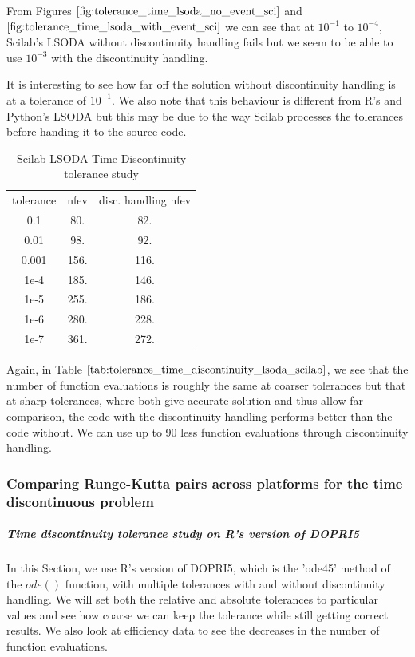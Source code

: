 From Figures $\ref{fig:tolerance_time_lsoda_no_event_sci}$ and $\ref{fig:tolerance_time_lsoda_with_event_sci}$ we can see that at $10^{-1}$ to $10^{-4}$, Scilab's LSODA without discontinuity handling fails but we seem to be able to use $10^{-3}$ with the discontinuity handling. 

It is interesting to see how far off the solution without discontinuity handling is at a tolerance of $10^{-1}$. We also note that this behaviour is different from R's and Python's LSODA but this may be due to the way Scilab processes the tolerances before handing it to the source code.

\begin{table}[h]
\caption {Scilab LSODA Time Discontinuity tolerance study} 
    \label{tab:tolerance_time_discontinuity_lsoda_scilab} 
\begin{center}
\begin{tabular}{ c c c }
tolerance & nfev &  disc. handling nfev \\ 
    0.1   & 80.  & 82.   \\
    0.01  & 98.  & 92.   \\
    0.001 & 156. & 116.  \\
    1e-4  & 185. & 146.  \\
    1e-5  & 255. & 186.  \\
    1e-6  & 280. & 228.  \\
    1e-7  & 361. & 272.  \\
\end{tabular}
\end{center}
\end{table}
Again, in Table $\ref{tab:tolerance_time_discontinuity_lsoda_scilab}$, we see that the number of function evaluations is roughly the same at coarser tolerances but that at sharp tolerances, where both give accurate solution and thus allow far comparison, the code with the discontinuity handling performs better than the code without. We can use up to 90 less function evaluations through discontinuity handling.  

\subsubsection{Comparing Runge-Kutta pairs across platforms for the time discontinuous problem}
\subparagraph{Time discontinuity tolerance study on R's version of DOPRI5}

In this Section, we use R's version of DOPRI5, which is the 'ode45' method of the $ode()$ function, with multiple tolerances with and without discontinuity handling. We will set both the relative and absolute tolerances to particular values and see how coarse we can keep the tolerance while still getting correct results. We also look at efficiency data to see the decreases in the number of function evaluations.

